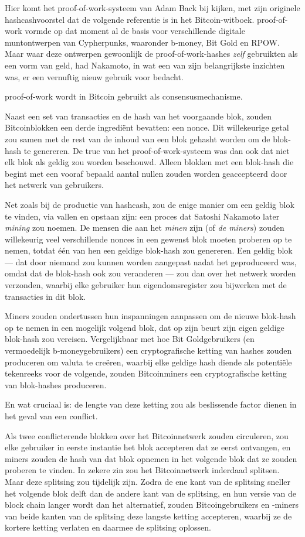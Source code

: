 \documentclass[
  a5paper,
  smalldemyvopaper,11pt,twoside,onecolumn,openright,extrafontsizes]{memoir}
\begin{document}
Hier komt het proof-of-work-systeem van Adam Back bij kijken, met zijn
originele hashcashvoorstel dat de volgende referentie is in het
Bitcoin-witboek. proof-of-work vormde op dat moment al de basis voor
verschillende digitale muntontwerpen van Cypherpunks, waaronder b-money,
Bit Gold en RPOW. Maar waar deze ontwerpen gewoonlijk de
proof-of-work-hashes \emph{zelf} gebruikten als een vorm van geld, had
Nakamoto, in wat een van zijn belangrijkste inzichten was, er een
vernuftig nieuw gebruik voor bedacht.

proof-of-work wordt in Bitcoin gebruikt als consensusmechanisme.

Naast een set van transacties en de hash van het voorgaande blok, zouden
Bitcoinblokken een derde ingrediënt bevatten: een nonce. Dit
willekeurige getal zou samen met de rest van de inhoud van een blok
gehasht worden om de blok-hash te genereren. De truc van het
proof-of-work-systeem was dan ook dat niet elk blok als geldig zou
worden beschouwd. Alleen blokken met een blok-hash die begint met een
vooraf bepaald aantal nullen zouden worden geaccepteerd door het netwerk
van gebruikers.

Net zoals bij de productie van hashcash, zou de enige manier om een
geldig blok te vinden, via vallen en opstaan zijn: een proces dat
Satoshi Nakamoto later \emph{mining} zou noemen. De mensen die aan het
\emph{minen} zijn (of \emph{de miners}) zouden willekeurig veel
verschillende nonces in een gewenst blok moeten proberen op te nemen,
totdat één van hen een geldige blok-hash zou genereren. Een geldig blok
--- dat door niemand zou kunnen worden aangepast nadat het geproduceerd
was, omdat dat de blok-hash ook zou veranderen --- zou dan over het
netwerk worden verzonden, waarbij elke gebruiker hun eigendomsregister
zou bijwerken met de transacties in dit blok.

Miners zouden ondertussen hun inspanningen aanpassen om de nieuwe
blok-hash op te nemen in een mogelijk volgend blok, dat op zijn beurt
zijn eigen geldige blok-hash zou vereisen. Vergelijkbaar met hoe Bit
Goldgebruikers (en vermoedelijk b-moneygebruikers) een cryptografische
ketting van hashes zouden produceren om valuta te creëren, waarbij elke
geldige hash diende als potentiële tekenreeks voor de volgende, zouden
Bitcoinminers een cryptografische ketting van blok-hashes produceren.

En wat cruciaal is: de lengte van deze ketting zou als beslissende
factor dienen in het geval van een conflict.

Als twee conflicterende blokken over het Bitcoinnetwerk zouden
circuleren, zou elke gebruiker in eerste instantie het blok accepteren
dat ze eerst ontvangen, en miners zouden de hash van dat blok opnemen in
het volgende blok dat ze zouden proberen te vinden. In zekere zin zou
het Bitcoinnetwerk inderdaad splitsen. Maar deze splitsing zou tijdelijk
zijn. Zodra de ene kant van de splitsing sneller het volgende blok delft
dan de andere kant van de splitsing, en hun versie van de block chain
langer wordt dan het alternatief, zouden Bitcoingebruikers en -miners
van beide kanten van de splitsing deze langste ketting accepteren,
waarbij ze de kortere ketting verlaten en daarmee de splitsing oplossen.
\end{document}
